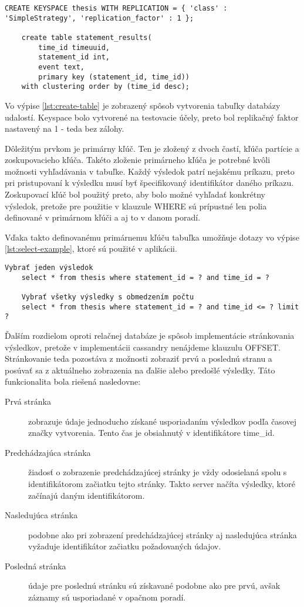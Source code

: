 		\begin{lstlisting}[label=lst:create-table,caption=Vytvorenie keyspace a tabuľky databázy udalostí]
	CREATE KEYSPACE thesis WITH REPLICATION = { 'class' : 'SimpleStrategy', 'replication_factor' : 1 };

	create table statement_results(
		time_id timeuuid,
		statement_id int,
		event text,
		primary key (statement_id, time_id))
	with clustering order by (time_id desc);
		\end{lstlisting}
		
		Vo výpise \ref{lst:create-table} je zobrazený spôsob vytvorenia tabuľky databázy udalostí. Keyspace bolo vytvorené na testovacie účely, preto bol replikačný faktor nastavený na 1 - teda bez zálohy.
		
		Dôležitým prvkom je primárny kľúč. Ten je zložený z dvoch častí, kľúča partície a zoskupovacieho kľúča. Takéto zloženie primárneho kľúča je potrebné kvôli možnosti vyhľadávania v tabuľke. Každý výsledok patrí nejakému príkazu, preto pri pristupovaní k výsledku musí byť špecifikovaný identifikátor daného príkazu. Zoskupovací kľúč bol použitý preto, aby bolo možné vyhľadať konkrétny výsledok, pretože pre použitie v klauzule WHERE sú prípustné len polia definované v primárnom kľúči a aj to v danom poradí.
		
		Vďaka takto definovanému primárnemu kľúču tabuľka umožňuje dotazy vo výpise \ref{lst:select-example}, ktoré sú použité v aplikácii.
		\begin{lstlisting}[label=lst:select-example,caption=Príklad príkazov vyhovujúcich definovanému primárnemu kľúču]
	Vybrať jeden výsledok
	select * from thesis where statement_id = ? and time_id = ?
			
	Vybrať všetky výsledky s obmedzením počtu
	select * from thesis where statement_id = ? and time_id <= ? limit ?
		\end{lstlisting}
		
		Ďalším rozdielom oproti relačnej databáze je spôsob implementácie stránkovania výsledkov, pretože v implementácii cassandry nenájdeme klauzulu OFFSET. Stránkovanie teda pozostáva z možnosti zobraziť prvú a poslednú stranu a posúvať sa z aktuálneho zobrazenia na ďalšie alebo predošlé výsledky. Táto funkcionalita bola riešená nasledovne: \cite{pagination}
		\begin{description}
			\item[Prvá stránka] zobrazuje údaje jednoducho získané usporiadaním výsledkov podľa časovej značky vytvorenia. Tento čas je obsiahnutý v identifikátore time\_id.
			\item[Predchádzajúca stránka] žiadosť o zobrazenie predchádzajúcej stránky je vždy odosielaná spolu s identifikátorom začiatku tejto stránky. Takto server načíta výsledky, ktoré začínajú daným identifikátorom.
			\item[Nasledujúca stránka] podobne ako pri zobrazení predchádzajúcej stránky aj nasledujúca stránka vyžaduje identifikátor začiatku požadovaných údajov.
			\item[Posledná stránka] údaje pre poslednú stránku sú získavané podobne ako pre prvú, avšak záznamy sú usporiadané v opačnom poradí.
		\end{description}
		
